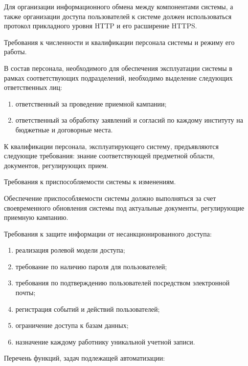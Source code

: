 Для организации информационного обмена между компонентами системы, а также организации доступа пользователей к системе должен использоваться протокол прикладного уровня HTTP и его расширение HTTPS.

Требования к численности и квалификации персонала системы и режиму его работы.

В состав персонала, необходимого для обеспечения эксплуатации системы в рамках соответствующих подразделений, необходимо выделение следующих ответственных лиц:

\begin{enumerate} 
  \item ответственный за проведение приемной кампании;
  
  \item ответственный за обработку заявлений и согласий по каждому институту на бюджетные и договорные места.
\end{enumerate}

К квалификации персонала, эксплуатирующего систему, предъявляются следующие требования: знание соответствующей предметной области, документов, регулирующих прием.

Требования к приспособляемости системы к изменениям.

Обеспечение приспособляемости системы должно выполняться за счет своевременного обновления системы под актуальные документы, регулирующие приемную кампанию.

Требования к защите информации от несанкционированного доступа:

\begin{enumerate} 
  \item реализация ролевой модели доступа;
  
  \item требование по наличию пароля для пользователей;
  
  \item требования по подтверждению пользователей посредством электронной почты;
  
  \item регистрация событий и действий пользователей;
  
  \item ограничение доступа к базам данных;
  
  \item назначение каждому работнику уникальной учетной записи.
\end{enumerate}

Перечень функций, задач подлежащей автоматизации:

